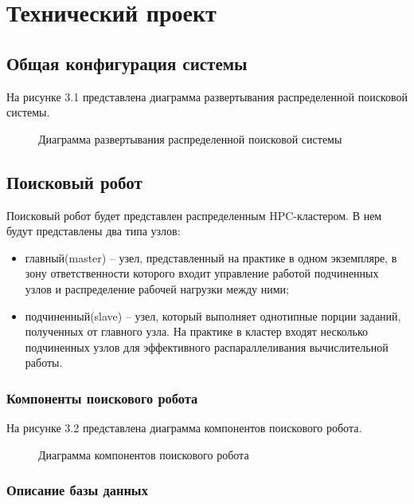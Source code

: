 \newsection
\section{Технический проект}

\subsection{Общая конфигурация системы}

На рисунке 3.1 представлена диаграмма развертывания распределенной поисковой системы.

\begin{figure}
\caption{Диаграмма развертывания распределенной поисковой системы}
\label{diagram_deployment:image}
\end{figure}

\subsection{Поисковый робот}

Поисковый робот будет представлен распределенным HPC-кластером. В нем будут представлены два типа узлов:
\begin{itemize}
\item главный(master) -- узел, представленный на практике в одном экземпляре, в зону ответственности которого входит управление работой подчиненных узлов и распределение рабочей нагрузки между ними;
\item подчиненный(slave) -- узел, который выполняет однотипные порции заданий, полученных от главного узла. На практике в кластер входят несколько подчиненных узлов для эффективного распараллеливания вычислительной работы.
\end{itemize}

\subsubsection{Компоненты поискового робота}

На рисунке 3.2 представлена диаграмма компонентов поискового робота.

\begin{figure}
\caption{Диаграмма компонентов поискового робота}
\label{robot/diagram_components:image}
\end{figure}

\subsubsection{Описание базы данных}

